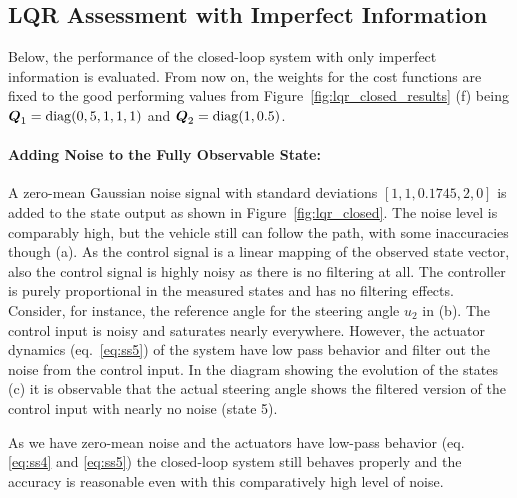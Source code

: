 \subsection{LQR Assessment with Imperfect Information}
Below, the performance of the closed-loop system with only imperfect information is evaluated.
From now on, the weights for the cost functions are fixed to the good performing values from Figure~\ref{fig:lqr_closed_results} (f) being $\boldsymbol{Q}_1=\mathop{\mathrm{diag}}(0, 5, 1, 1, 1)$ and $\boldsymbol{Q}_2=\mathop{\mathrm{diag}}(1, 0.5)$.

\paragraph{Adding Noise to the Fully Observable State:} A zero-mean Gaussian noise signal with standard deviations $\left[1, 1, 0.1745, 2, 0\right]$ is added to the state output as shown in Figure~\ref{fig:lqr_closed}. 
The noise level is comparably high, but the vehicle still can follow the path, with some inaccuracies though (a).
As the control signal is a linear mapping of the observed state vector, also the control signal is highly noisy as there is no filtering at all.
The controller is purely proportional in the measured states and has no filtering effects.
Consider, for instance, the reference angle for the steering angle $u_2$ in (b). 
The control input is noisy and saturates nearly everywhere.
However, the actuator dynamics (eq.~\ref{eq:ss5}) of the system have low pass behavior and filter out the noise from the control input.
In the diagram showing the evolution of the states (c) it is observable that the actual steering angle shows the filtered version of the control input with nearly no noise (state 5).

As we have zero-mean noise and the actuators have low-pass behavior (eq. \ref{eq:ss4} and \ref{eq:ss5}) the closed-loop system still behaves properly and the accuracy is reasonable even with this comparatively high level of noise.

